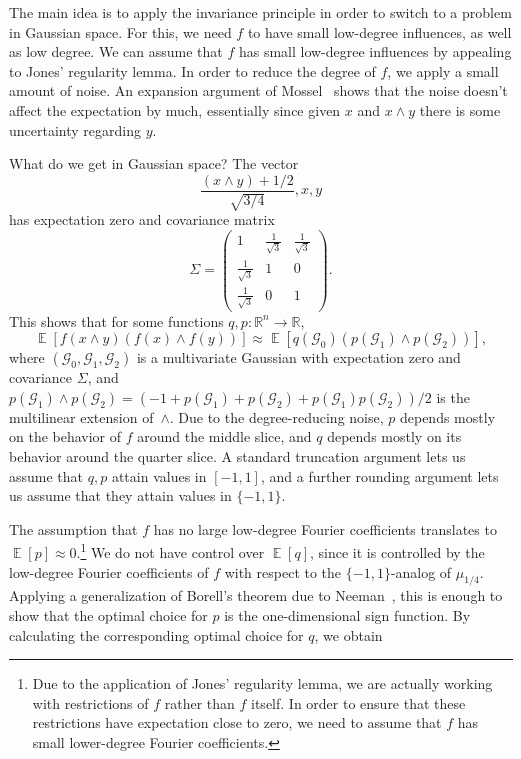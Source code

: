 \documentclass{article}
\theoremstyle{definition}
\theoremstyle{remark}
\DeclareMathOperator*{\E}{\mathbb{E}}
\providecommand{\cG}{\mathcal{G}}
\begin{document}
The main idea is to apply the invariance principle in order to switch to a problem in Gaussian space. For this, we need $f$ to have small low-degree influences, as well as low degree. We can assume that $f$ has small low-degree influences by appealing to Jones' regularity lemma. In order to reduce the degree of $f$, we apply a small amount of noise. An expansion argument of Mossel~\cite{Mossel2010} shows that the noise doesn't affect the expectation by much, essentially since given $x$ and $x \land y$ there is some uncertainty regarding $y$.

What do we get in Gaussian space? The vector
\[
 \frac{(x \land y) + 1/2}{\sqrt{3/4}}, x, y
\]
has expectation zero and covariance matrix
\[
 \Sigma = \begin{pmatrix}
 1 & \frac{1}{\sqrt{3}} & \frac{1}{\sqrt{3}} \\
 \frac{1}{\sqrt{3}} & 1 & 0 \\
 \frac{1}{\sqrt{3}} & 0 & 1
 \end{pmatrix} .
\]
This shows that for some functions $q,p\colon \mathbb{R}^n \to \mathbb{R}$,
\[
 \E[f(x \land y) (f(x) \land f(y))] \approx \E[q(\cG_0) (p(\cG_1) \land p(\cG_2))],
\]
where $(\cG_0,\cG_1,\cG_2)$ is a multivariate Gaussian with expectation zero and covariance $\Sigma$, and $p(\cG_1) \land p(\cG_2) = (-1 + p(\cG_1) + p(\cG_2) + p(\cG_1) p(\cG_2))/2$ is the multilinear extension of~$\land$. Due to the degree-reducing noise, $p$ depends mostly on the behavior of $f$ around the middle slice, and $q$ depends mostly on its behavior around the quarter slice.
A standard truncation argument lets us assume that $q,p$ attain values in $[-1,1]$, and a further rounding argument lets us assume that they attain values in $\{-1,1\}$.

The assumption that $f$ has no large low-degree Fourier coefficients translates to $\E[p] \approx 0$.\footnote{Due to the application of Jones' regularity lemma, we are actually working with restrictions of $f$ rather than $f$ itself. In order to ensure that these restrictions have expectation close to zero, we need to assume that $f$ has small lower-degree Fourier coefficients.}
We do not have control over $\E[q]$, since it is controlled by the low-degree Fourier coefficients of $f$ with respect to the $\{-1,1\}$-analog of $\mu_{1/4}$. Applying a generalization of Borell's theorem due to Neeman~\cite{Neeman}, this is enough to show that the optimal choice for $p$ is the one-dimensional sign function. By calculating the corresponding optimal choice for $q$, we obtain
\end{document}
